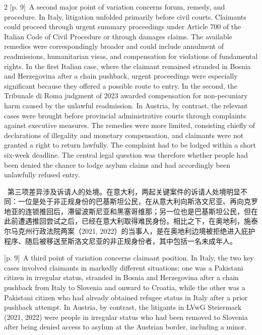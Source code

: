 \documentclass[10pt,a4paper]{article}
\begin{document}
\begin{paracol}{2}
\switchcolumn
{\scriptsize\color{gray} [p. 9]}\ A second major point of variation concerns forum, remedy, and procedure. In Italy, litigation unfolded primarily before civil courts. Claimants could proceed through urgent summary proceedings under Article 700 of the Italian Code of Civil Procedure or through damages claims. The available remedies were correspondingly broader and could include annulment of readmissions, humanitarian visas, and compensation for violations of fundamental rights. In the first Italian case, where the claimant remained stranded in Bosnia and Herzegovina after a chain pushback, urgent proceedings were especially significant because they offered a possible route to entry. In the second, the Tribunale di Roma judgment of 2023 awarded compensation for non-pecuniary harm caused by the unlawful readmission. In Austria, by contrast, the relevant cases were brought before provincial administrative courts through complaints against executive measures. The remedies were more limited, consisting chiefly of declarations of illegality and monetary compensation, and claimants were not granted a right to return lawfully. The complaint had to be lodged within a short six-week deadline. The central legal question was therefore whether people had been denied the chance to lodge asylum claims and had accordingly been unlawfully refused entry.\par
\switchcolumn*
{\scriptsize\color{gray} [p. 9]}\ 第三项差异涉及诉请人的处境。在意大利，两起关键案件的诉请人处境明显不同：一位是处于非正规身份的巴基斯坦公民，在从意大利向斯洛文尼亚、再向克罗地亚的连锁推回后，滞留波斯尼亚和黑塞哥维那；另一位也是巴基斯坦公民，但在此前遭遇推回尝试之后，已经在意大利取得难民身份。相比之下，在奥地利，施泰尔马克州行政法院两案（2021, 2022）的当事人，是在奥地利边境被拒绝进入庇护程序、随后被移送至斯洛文尼亚的非正规身份者，其中包括一名未成年人。\par
\switchcolumn
{\scriptsize\color{gray} [p. 9]}\ A third point of variation concerns claimant position. In Italy, the two key cases involved claimants in markedly different situations: one was a Pakistani citizen in irregular status, stranded in Bosnia and Herzegovina after a chain pushback from Italy to Slovenia and onward to Croatia, while the other was a Pakistani citizen who had already obtained refugee status in Italy after a prior pushback attempt. In Austria, by contrast, the litigants in LVwG Steiermark (2021, 2022) were people in irregular status who had been removed to Slovenia after being denied access to asylum at the Austrian border, including a minor.\par

\end{paracol}
\end{document}
